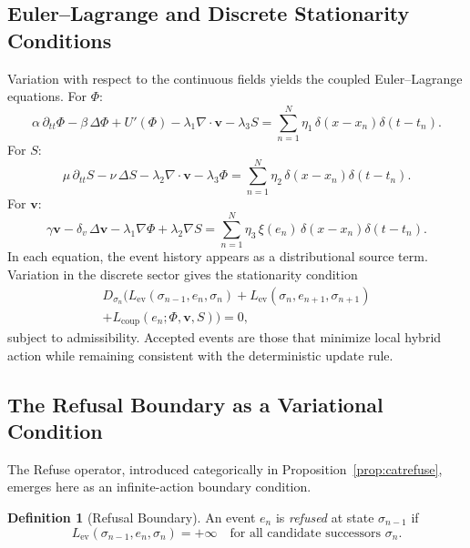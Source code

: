 \documentclass[12pt, twoside]{article}
\theoremstyle{plain}
\theoremstyle{definition}
\newtheorem{definition}[theorem]{Definition}
\theoremstyle{remark}
\begin{document}
\subsection{Euler--Lagrange and Discrete Stationarity Conditions}

Variation with respect to the continuous fields yields the
coupled Euler--Lagrange equations.
For $\Phi$:
\[
  \alpha\,\partial_{tt}\Phi
  - \beta\,\Delta\Phi
  + U'(\Phi)
  - \lambda_1\nabla\cdot\mathbf{v}
  - \lambda_3 S
  = \sum_{n=1}^{N} \eta_1\,\delta(x-x_n)\delta(t-t_n).
\]
For $S$:
\[
  \mu\,\partial_{tt}S
  - \nu\,\Delta S
  - \lambda_2\nabla\cdot\mathbf{v}
  - \lambda_3\Phi
  = \sum_{n=1}^{N} \eta_2\,\delta(x-x_n)\delta(t-t_n).
\]
For $\mathbf{v}$:
\[
  \gamma\mathbf{v}
  - \delta_v\,\Delta\mathbf{v}
  - \lambda_1\nabla\Phi
  + \lambda_2\nabla S
  = \sum_{n=1}^{N} \eta_3\,\xi(e_n)\,\delta(x-x_n)\delta(t-t_n).
\]
In each equation, the event history appears as a distributional
source term.
Variation in the discrete sector gives the stationarity condition
\begin{multline*}
  D_{\sigma_n}\bigl(
    L_{\mathrm{ev}}(\sigma_{n-1}, e_n, \sigma_n)
    + L_{\mathrm{ev}}(\sigma_n, e_{n+1}, \sigma_{n+1}) \\
    + L_{\mathrm{coup}}(e_n;\Phi,\mathbf{v},S)
  \bigr) = 0,
\end{multline*}
subject to admissibility.
Accepted events are those that minimize local hybrid action
while remaining consistent with the deterministic update rule.

\subsection{The Refusal Boundary as a Variational Condition}

The Refuse operator, introduced categorically in
Proposition~\ref{prop:catrefuse}, emerges here as an infinite-action
boundary condition.

\begin{definition}[Refusal Boundary]
An event $e_n$ is \emph{refused} at state $\sigma_{n-1}$ if
\[
  L_{\mathrm{ev}}(\sigma_{n-1}, e_n, \sigma_n) = +\infty
  \quad\text{for all candidate successors } \sigma_n.
\]
\end{definition}
\end{document}
